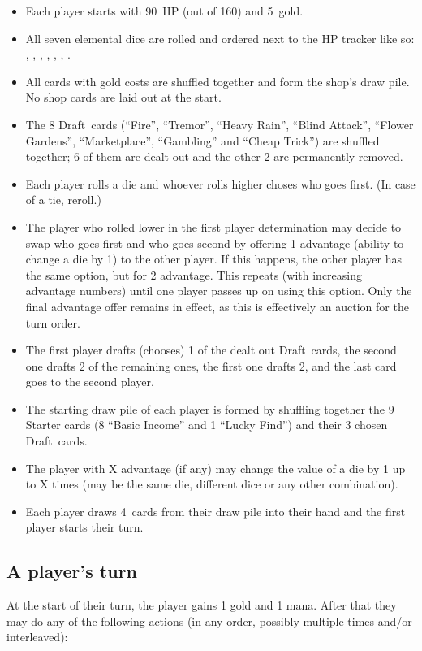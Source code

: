 \documentclass[dvipsnames,parskip,a4paper]{scrartcl}
\newcommand{\iconsize}{3.4mm}
\newcommand{\icondepth}{0.45mm}
\newcommand{\icon}[1]{\raisebox{-\icondepth}{\texttt{[image:  \#1 ]}}}
\newcommand{\fire}{\icon{icons/fire.png}}
\newcommand{\earth}{\icon{icons/earth.png}}
\newcommand{\water}{\icon{icons/water.png}}
\newcommand{\nature}{\icon{icons/nature.png}}
\newcommand{\magic}{\icon{icons/magic.png}}
\newcommand{\gold}{\icon{icons/gold.png}}
\newcommand{\chance}{\icon{icons/chance.png}}
\newcommand{\draft}{Draft}
\newcommand{\startgold}{5}
\newcommand{\handsize}{4}
\newcommand{\starthp}{90}
\newcommand{\maxhp}{160}
\begin{document}
\begin{itemize}
\item Each player starts with \starthp \ HP (out of \maxhp) and \startgold \ gold.
\item All seven elemental dice are rolled and ordered next to the HP tracker like so: \fire, \earth, \water, \nature, \gold, \magic, \chance.
\item All cards with gold costs are shuffled together and form the shop's draw pile. No shop cards are laid out at the start.
\item The 8 \draft \ cards (``Fire'', ``Tremor'', ``Heavy Rain'', ``Blind Attack'', ``Flower Gardens'', ``Marketplace'', ``Gambling'' and ``Cheap Trick'') are shuffled together; 6 of them are dealt out and the other 2 are permanently removed.
\item Each player rolls a die and whoever rolls higher choses who goes first. (In case of a tie, reroll.)
\item The player who rolled lower in the first player determination may decide to swap who goes first and who goes second by offering 1 advantage (ability to change a die by 1) to the other player. If this happens, the other player has the same option, but for 2 advantage. This repeats (with increasing advantage numbers) until one player passes up on using this option. Only the final advantage offer remains in effect, as this is effectively an auction for the turn order.
\item The first player drafts (chooses) 1 of the dealt out \draft \ cards, the second one drafts 2 of the remaining ones, the first one drafts 2, and the last card goes to the second player.
\item The starting draw pile of each player is formed by shuffling together the 9 Starter cards (8 ``Basic Income'' and 1 ``Lucky Find'') and their 3 chosen \draft \ cards.
\item The player with X advantage (if any) may change the value of a die by 1 up to X times (may be the same die, different dice or any other combination).
\item Each player draws \handsize \ cards from their draw pile into their hand and the first player starts their turn.
\end{itemize}

\subsection*{A player's turn}

At the start of their turn, the player gains 1 gold and 1 mana. After that they may do any of the following actions (in any order, possibly multiple times and/or interleaved):
\end{document}
